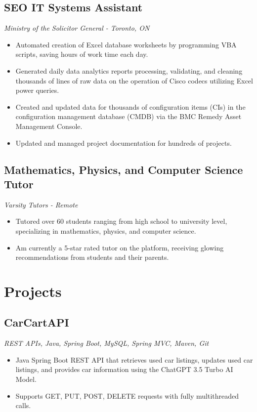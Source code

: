 \documentclass{article}
\begin{document}
\subsection*{SEO IT Systems Assistant \hfill {}}
\textit{Ministry of the Solicitor General - Toronto, ON}
\begin{itemize}
    \item Automated creation of Excel database worksheets by programming VBA scripts, saving hours of work time each day.
    \item Generated daily data analytics reports processing, validating, and cleaning thousands of lines of raw data on the operation of Cisco codecs utilizing Excel power queries.
    \item Created and updated data for thousands of configuration items (CIs) in the configuration management database (CMDB) via the BMC Remedy Asset Management Console.
    \item Updated and managed project documentation for hundreds of projects.
\end{itemize}

\subsection*{Mathematics, Physics, and Computer Science Tutor \hfill {}}
\textit{Varsity Tutors - Remote}
\begin{itemize}
    \item Tutored over 60 students ranging from high school to university level, specializing in mathematics, physics, and computer science.
    \item Am currently a 5-star rated tutor on the platform, receiving glowing recommendations from students and their parents.
\end{itemize}

\section*{Projects}
\subsection*{CarCartAPI}
\textit{REST APIs, Java, Spring Boot, MySQL, Spring MVC, Maven, Git}
\begin{itemize}
    \item Java Spring Boot REST API that retrieves used car listings, updates used car listings, and provides car information using the ChatGPT 3.5 Turbo AI Model.
    \item Supports GET, PUT, POST, DELETE requests with fully multithreaded calls.
\end{itemize}
\end{document}
